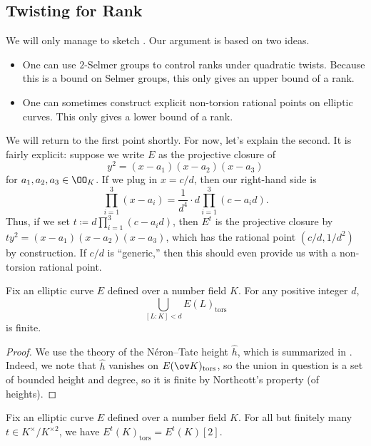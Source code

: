 \documentclass[../notes.tex]{subfiles}
\begin{document}
\subsection{Twisting for Rank}
We will only manage to sketch . Our argument is based on two ideas.
\begin{itemize}
	\item One can use $2$-Selmer groups to control ranks under quadratic twists. Because this is a bound on Selmer groups, this only gives an upper bound of a rank.
	\item One can sometimes construct explicit non-torsion rational points on elliptic curves. This only gives a lower bound of a rank.
\end{itemize}
We will return to the first point shortly. For now, let's explain the second. It is fairly explicit: suppose we write $E$ as the projective closure of
\[y^2=(x-a_1)(x-a_2)(x-a_3)\]
for $a_1,a_2,a_3\in\OO_K$. If we plug in $x=c/d$, then our right-hand side is
\[\prod_{i=1}^3(x-a_i)=\frac1{d^4}\cdot d\prod_{i=1}^3(c-a_id).\]
Thus, if we set $t\coloneqq d\prod_{i=1}^3(c-a_id)$, then $E^t$ is the projective closure by $ty^2=(x-a_1)(x-a_2)(x-a_3)$, which has the rational point $\left(c/d,1/d^2\right)$ by construction. If $c/d$ is ``generic,'' then this should even provide us with a non-torsion rational point.
\begin{lemma} \label{lem:bound-torsion-degree}
	Fix an elliptic curve $E$ defined over a number field $K$. For any positive integer $d$,
	\[\bigcup_{[L:K]<d}E(L)_{\mathrm{tors}}\]
	is finite.
\end{lemma}
\begin{proof}
	We use the theory of the N\'eron--Tate height $\hat h$, which is summarized in \cite[Theorem~9.3]{silverman}. Indeed, we note that $\hat h$ vanishes on $E(\ov K)_{\mathrm{tors}}$, so the union in question is a set of bounded height and degree, so it is finite by Northcott's property (of heights).
\end{proof}
\begin{proposition} \label{prop:bound-2-torsion-twist}
	Fix an elliptic curve $E$ defined over a number field $K$. For all but finitely many $t\in K^\times/K^{\times2}$, we have $E^t(K)_{\mathrm{tors}}=E^t(K)[2]$.
\end{proposition}
\end{document}
